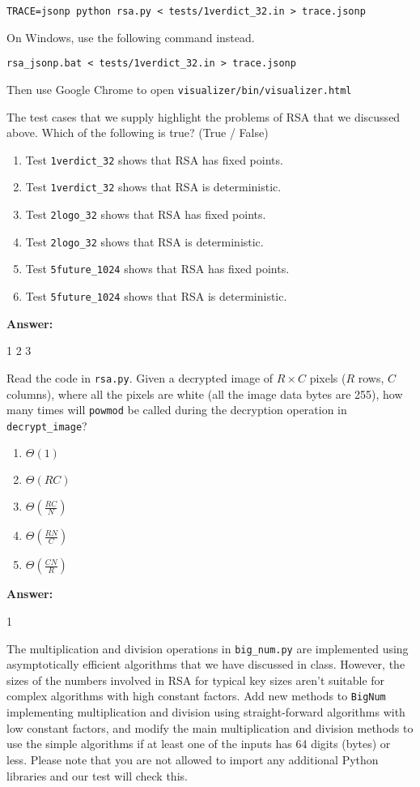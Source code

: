 \documentclass[12pt,twoside]{article}
\newcommand{\answer}{
 \par\medskip
 \textbf{Answer:}
}
\newcommand{\answerIIIe}{ \answer
1 2 3
}
\newcommand{\answerIIIf}{ \answer
1
}
\begin{document}
\begin{problems}
\texttt{TRACE=jsonp python rsa.py < tests/1verdict\_32.in > trace.jsonp}

On Windows, use the following command instead.

\texttt{rsa\_jsonp.bat < tests/1verdict\_32.in > trace.jsonp}

Then use Google Chrome to open
\texttt{visualizer/bin/visualizer.html}

\begin{problemparts}
\problempart {} The test cases that we supply highlight the problems of
RSA that we discussed above. Which of the following is true? (True / False)
\begin{enumerate}
  \item Test \texttt{1verdict\_32} shows that RSA has fixed points.
  \item Test \texttt{1verdict\_32} shows that RSA is deterministic.
  \item Test \texttt{2logo\_32} shows that RSA has fixed points.
  \item Test \texttt{2logo\_32} shows that RSA is deterministic.
  \item Test \texttt{5future\_1024} shows that RSA has fixed points.
  \item Test \texttt{5future\_1024} shows that RSA is deterministic.
\end{enumerate}
\answerIIIe

\problempart {} Read the code in \texttt{rsa.py}. Given a decrypted
image of $R \times C$ pixels ($R$ rows, $C$ columns), where all the pixels
are white (all the image data bytes are 255), how many times will
\texttt{powmod} be called during the decryption operation in
\texttt{decrypt\_image}?
\begin{enumerate}
  \item $\Theta(1)$
  \item $\Theta(R C)$
  \item $\Theta(\frac{RC}{N})$
  \item $\Theta(\frac{RN}{C})$
  \item $\Theta(\frac{CN}{R})$
\end{enumerate}
\answerIIIf

\problempart {} The multiplication and division operations in
\texttt{big\_num.py} are implemented using asymptotically efficient algorithms
that we have discussed in class. However, the sizes of the numbers involved in
RSA for typical key sizes aren't suitable for complex algorithms with high
constant factors. Add new methods to \texttt{BigNum} implementing multiplication
and division using straight-forward algorithms with low constant factors, and
modify the main multiplication and division methods to use the simple algorithms
if at least one of the inputs has 64 digits (bytes) or less. Please note that
you are not allowed to import any additional Python libraries and our test will
check this.
\end{problemparts}


\end{problems}
\end{document}

